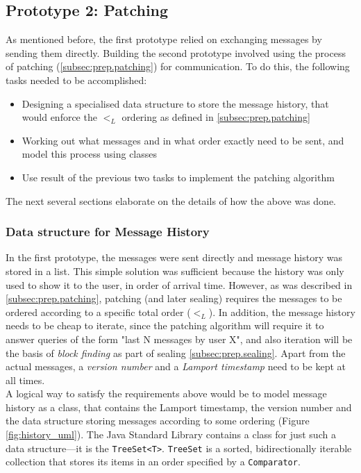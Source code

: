 \documentclass[a4paper, twoside, 12pt]{report}
\begin{document}
\subsection{Prototype 2: Patching}
\label{subsec:impl.proto.patch}
As mentioned before, the first prototype relied on exchanging messages by sending them directly. Building the second prototype involved using the process of patching (\cref{subsec:prep.patching}) for communication. To do this, the following tasks needed to be accomplished:
\begin{itemize}
    \item Designing a specialised data structure to store the message history, that would enforce the $<_L$ ordering as defined in \cref{subsec:prep.patching}
    \item Working out what messages and in what order exactly need to be sent, and model this process using classes
    \item Use result of the previous two tasks to implement the patching algorithm
\end{itemize}
The next several sections elaborate on the details of how the above was done.

\subsubsection{Data structure for Message History}
In the first prototype, the messages were sent directly and message history was stored in a list. This simple solution was sufficient because the history was only used to show it to the user, in order of arrival time. However, as was described in \cref{subsec:prep.patching}, patching (and later sealing) requires the messages to be ordered according to a specific total order ($<_L$). In addition, the message history needs to be cheap to iterate, since the patching algorithm will require it to answer queries of the form "last N messages by user X", and also iteration will be the basis of \emph{block finding} as part of sealing \cref{subsec:prep.sealing}. Apart from the actual messages, a \emph{version number} and a \emph{Lamport timestamp} need to be kept at all times. \\

A logical way to satisfy the requirements above would be to model message history as a class, that contains the Lamport timestamp, the version number and the data structure storing messages according to some ordering (Figure \ref{fig:history_uml}). The Java Standard Library contains a class for just such a data structure---it is the \texttt{TreeSet<T>}. \texttt{TreeSet} is a sorted, bidirectionally iterable collection that stores its items in an order specified by a \texttt{Comparator}.
\end{document}
